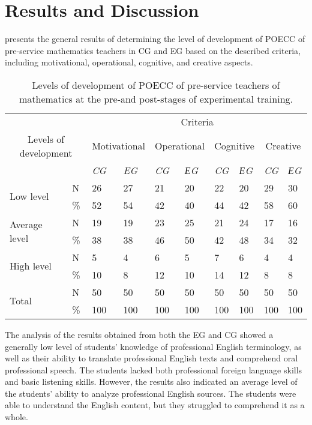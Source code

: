 \section{Results and Discussion}\label{sec-results}

 presents the general results of determining the level of
development of POECC of pre-service mathematics teachers in CG and EG
based on the described criteria, including motivational, operational,
cognitive, and creative aspects.

\begin{table}[htpb]
\centering
\begin{threeparttable}
\caption{Levels of development of POECC of pre-service teachers of mathematics at the pre-and post-stages of experimental training.}
\label{tab-03}
\begin{tabular}{ l l l l l l l l l l}
\toprule		
 &  & \multicolumn{8}{c}{Criteria}\\
\multicolumn{2}{c}{Levels of development} & \multicolumn{2}{c}{Motivational} & \multicolumn{2}{c}{Operational} & \multicolumn{2}{c}{Cognitive} & \multicolumn{2}{c}{Creative} \\
 & & \emph{CG} & \emph{EG} & \emph{CG} & \emph{ЕG} & \emph{CG} & \emph{ЕG} & \emph{CG} & \emph{ЕG} \\
\midrule
\multirow{2}{*}{Low level} & N & 26 & 27 & 21 & 20 & 22 & 20 & 29 & 30 \\
 & \% & 52 & 54 & 42 & 40 & 44 & 42 & 58 & 60 \\
\cmidrule{2-10}
\multirow{2}{*}{Average level} & N & 19 & 19 & 23 & 25 & 21 & 24 & 17 & 16 \\
 & \% & 38 & 38 & 46 & 50 & 42 & 48 & 34 & 32 \\
\cmidrule{2-10}
\multirow{2}{*}{High level} & N & 5 & 4 & 6 & 5 & 7 & 6 & 4 & 4 \\
 & \% & 10 & 8 & 12 & 10 & 14 & 12 & 8 & 8 \\
\cmidrule{2-10}
\multirow{2}{*}{Total} & N & 50 & 50 & 50 & 50 & 50 & 50 & 50 & 50 \\
 & \% & 100 & 100 & 100 & 100 & 100 & 100 & 100 & 100  \\
\bottomrule
\end{tabular}
\end{threeparttable}
\end{table}

The analysis of the results obtained from both the EG and CG showed a
generally low level of students' knowledge of professional English
terminology, as well as their ability to translate professional English
texts and comprehend oral professional speech. The students lacked both
professional foreign language skills and basic listening skills.
However, the results also indicated an average level of the students'
ability to analyze professional English sources. The students were able
to understand the English content, but they struggled to comprehend it
as a whole.

